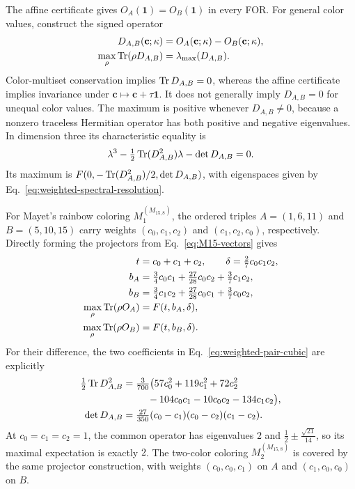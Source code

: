 \documentclass[aps,pra,reprint,superscriptaddress,longbibliography,nofootinbib,floatfix,10pt]{revtex4-2}
\theoremstyle{definition}\newtheorem{definition}[theorem]{Definition}
\theoremstyle{remark}\newtheorem{remark}[theorem]{Remark}
\begin{document}
The affine certificate gives $O_A(\mathbf1)=O_B(\mathbf1)$ in every FOR. For general color values, construct the signed operator
\begin{equation}\label{eq:weighted-pair-difference}
\begin{aligned}
D_{A,B}(\mathbf c;\kappa)&=O_A(\mathbf c;\kappa)-O_B(\mathbf c;\kappa),\\
\max_\rho\operatorname{Tr}(\rho D_{A,B})&=\lambda_{\max}(D_{A,B}).
\end{aligned}
\end{equation}
Color-multiset conservation implies $\operatorname{Tr} D_{A,B}=0$, whereas the affine certificate implies invariance under $\mathbf c\mapsto\mathbf c+\tau\mathbf1$. It does not generally imply $D_{A,B}=0$ for unequal color values. The maximum is positive whenever $D_{A,B}\ne0$, because a nonzero traceless Hermitian operator has both positive and negative eigenvalues. In dimension three its characteristic equality is
\begin{equation}\label{eq:weighted-pair-cubic}
\lambda^3-\tfrac12\operatorname{Tr}(D_{A,B}^2)\lambda-\det D_{A,B}=0.
\end{equation}
Its maximum is $F(0,-\operatorname{Tr}(D_{A,B}^2)/2,\det D_{A,B})$, with eigenspaces given by Eq.~\eqref{eq:weighted-spectral-resolution}.

For Mayet's rainbow coloring $M_1^{(M_{15,8})}$, the ordered triples $A=(1,6,11)$ and $B=(5,10,15)$ carry weights $(c_0,c_1,c_2)$ and $(c_1,c_2,c_0)$, respectively. Directly forming the projectors from Eq.~\eqref{eq:M15-vectors} gives
\begin{equation}\label{eq:weighted-M15}
\begin{aligned}
t&=c_0+c_1+c_2,\qquad \delta=\tfrac27c_0c_1c_2,\\
b_A&=\tfrac34c_0c_1+\tfrac{27}{28}c_0c_2+\tfrac37c_1c_2,\\
b_B&=\tfrac34c_1c_2+\tfrac{27}{28}c_0c_1+\tfrac37c_0c_2,\\
\max_\rho\operatorname{Tr}(\rho O_A)&=F(t,b_A,\delta),\\
\max_\rho\operatorname{Tr}(\rho O_B)&=F(t,b_B,\delta).
\end{aligned}
\end{equation}
For their difference, the two coefficients in Eq.~\eqref{eq:weighted-pair-cubic} are explicitly
\begin{equation}\label{eq:weighted-M15-difference}
\begin{aligned}
\tfrac12\operatorname{Tr} D_{A,B}^2={}&\tfrac3{700}\bigl(57c_0^2+119c_1^2+72c_2^2\\
&\hspace{1.2em}-104c_0c_1-10c_0c_2-134c_1c_2\bigr),\\
\det D_{A,B}={}&\tfrac{27}{350}(c_0-c_1)(c_0-c_2)(c_1-c_2).
\end{aligned}
\end{equation}
At $c_0=c_1=c_2=1$, the common operator has eigenvalues $2$ and $\tfrac12\pm\tfrac{\sqrt{21}}{14}$, so its maximal expectation is exactly $2$. The two-color coloring $M_2^{(M_{15,8})}$ is covered by the same projector construction, with weights $(c_0,c_0,c_1)$ on $A$ and $(c_1,c_0,c_0)$ on $B$.
\end{document}
